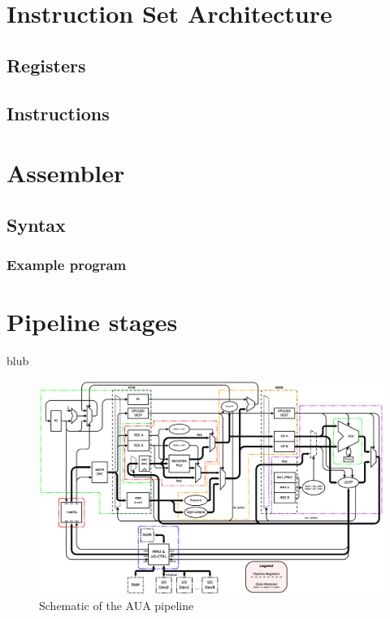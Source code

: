 \documentclass[%
	pdftex,
	a4paper,
	oneside,
	bibtotoc,%
	idxtotoc,%
	bibtotocnumbered,
	halfparskip,%
]{scrbook}
\begin{document}
\chapter{Instruction Set Architecture}
\section{Registers}
\section{Instructions}

\chapter{Assembler}
\section{Syntax}
\subsection{Example program}
\chapter{Pipeline stages}
blub

\begin{figure}[h!]
	\centerline { %
	\includegraphics[width=1.2\textwidth]{schematic}
	}
	\caption[Schematic of the AUA pipeline]
	{Schematic of the AUA pipeline
	\label{label-schematic} }
\end{figure}
\end{document}

